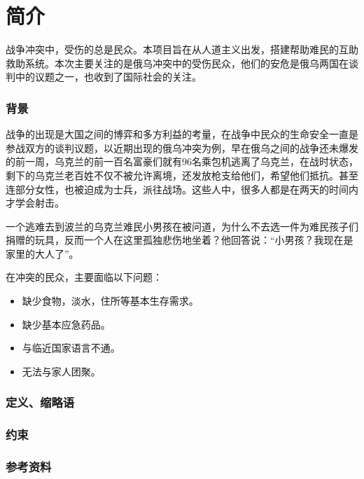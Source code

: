 \chapter{简介}

战争冲突中，受伤的总是民众。本项目旨在从人道主义出发，搭建帮助难民的互助救助系统。本次主要关注的是俄乌冲突中的受伤民众，他们的安危是俄乌两国在谈判中的议题之一，也收到了国际社会的关注。

\subsection{背景}

战争的出现是大国之间的博弈和多方利益的考量，在战争中民众的生命安全一直是参战双方的谈判议题，以近期出现的俄乌冲突为例，早在俄乌之间的战争还未爆发的前一周，乌克兰的前一百名富豪们就有96名乘包机逃离了乌克兰，在战时状态，剩下的乌克兰老百姓不仅不被允许离境，还发放枪支给他们，希望他们抵抗。甚至连部分女性，也被迫成为士兵，派往战场。这些人中，很多人都是在两天的时间内才学会射击。

一个逃难去到波兰的乌克兰难民小男孩在被问道，为什么不去选一件为难民孩子们捐赠的玩具，反而一个人在这里孤独悲伤地坐着？他回答说：“小男孩？我现在是家里的大人了”。
	
在冲突的民众，主要面临以下问题：

\begin{itemize}
   \item 缺少食物，淡水，住所等基本生存需求。
   \item 缺少基本应急药品。
   \item 与临近国家语言不通。
   \item 无法与家人团聚。
\end{itemize}

\subsection{定义、缩略语}

\subsection{约束}

\subsection{参考资料}

